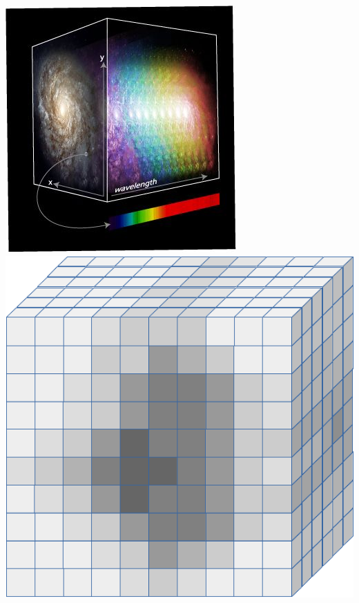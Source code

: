 \documentclass[slidestop,compress,mathserif,color,12pt]{beamer}
\begin{document}
\begin{frame}
\begin{minipage}{0.65\linewidth}
\end{minipage}
\hfill
\begin{minipage}{0.29\linewidth}
\includegraphics[width=0.99\linewidth]{spectralcube.jpg}
\vskip1cm
\includegraphics[width=0.99\linewidth]{cube.png}\\
\end{minipage}
\end{frame}
\end{document}
